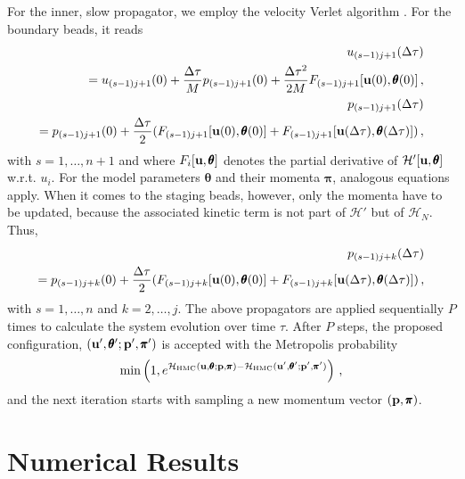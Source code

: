 \documentclass[12pt,a4paper,final]{iopart}
\newcommand{\bt}{\pmb\theta}
\newcommand{\vc}[1]{{\bf #1 }}
\begin{document}
For the inner, slow propagator, we employ the velocity Verlet algorithm \cite{swope_1982_verlet}.
For the boundary beads, it reads
\begin{eqnarray}
  u_{(s-1)j+1}(\Delta\tau) \nonumber \\
  = u_{(s-1)j+1}(0)
  +
  \frac{\Delta\tau}{M} p_{(s-1)j+1}(0)
  +
  \frac{\Delta \tau^2}{2M}
  F_{(s-1)j+1}[\vc u(0),{\pmb\theta}(0)]\,,\\
  p_{(s-1)j+1}(\Delta\tau) \nonumber \\
  = p_{(s-1)j+1}(0)
  +
  \frac{\Delta\tau}{2}
  (
  F_{(s-1)j+1}[\vc u(0),{\pmb\theta}(0)]
  +
  F_{(s-1)j+1}[\vc u(\Delta\tau),{\pmb\theta}(\Delta\tau)]
  )\,,
\end{eqnarray}
with $s=1,\dots,n+1$ and where $F_i[\vc u,{\pmb\theta}]$ denotes the partial derivative of $\mathcal H'[\vc u,{\pmb\theta}]$ w.r.t. $u_i$.
For the model parameters $\bt$ and their momenta ${\pmb\pi}$, analogous equations apply.
When it comes to the staging beads, however, only the momenta have to be updated, because the associated kinetic term is not part of $\mathcal H'$ but of $\mathcal H_N$.
Thus,
\begin{eqnarray}
  p_{(s-1)j+k}(\Delta\tau) \nonumber \\
  =
  p_{(s-1)j+k}(0)
  +
  \frac{\Delta\tau}{2}
  (
  F_{(s-1)j+k}[\vc u(0),{\pmb\theta}(0)]
  +
  F_{(s-1)j+k}[\vc u(\Delta\tau),{\pmb\theta}(\Delta\tau)]
  )
  \,,
\end{eqnarray}
with $s=1,\dots,n$ and $k=2,\dots,j$. The above propagators are applied sequentially $P$ times to calculate the system evolution over time $\tau$.
After $P$ steps, the proposed configuration, $(\vc u',\bt';\vc p',{\pmb\pi}')$ is accepted with the Metropolis probability
\begin{equation}
  \min
  \left(
    1,
    e^{\mathcal{H}_{\mbox{\tiny HMC}}(\vc u,\bt;\vc p,{\pmb\pi}) - \mathcal{H}_{\mbox{\tiny HMC}}(\vc u',\bt';\vc p',{\pmb\pi}')}
  \right)\,,
\end{equation}
and the next iteration starts with sampling a new momentum vector $(\vc p,{\pmb\pi})$.

\section{Numerical Results}\label{numerical_results}
\end{document}
